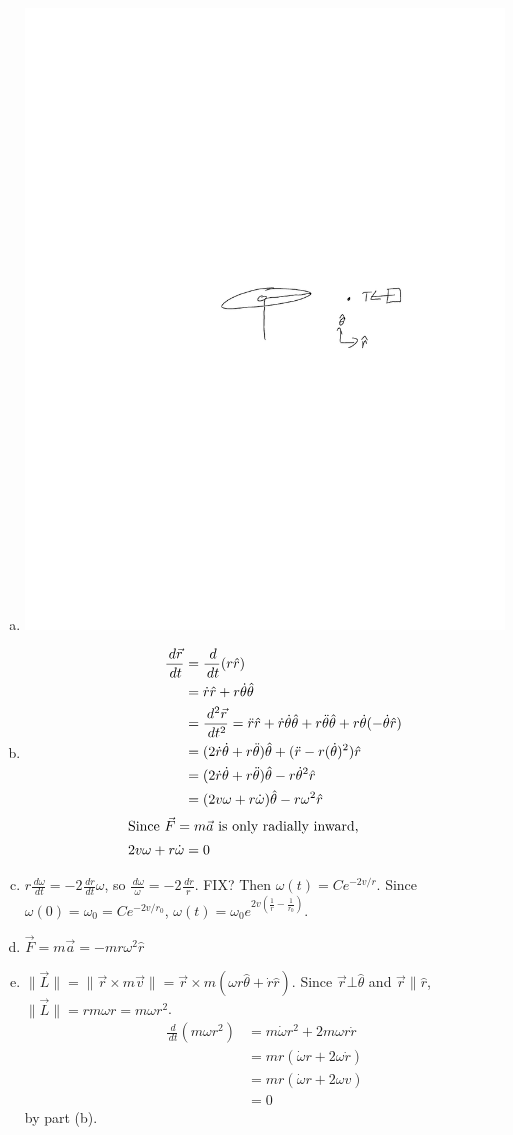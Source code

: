 \documentclass{esg8012pset}
\renewcommand{\d}{\,d}
\providecommand{\norm}[1]{\lVert#1\rVert}
\begin{document}
\begin{solution}
  \begin{enumerate}[a)]
    \item \includegraphics[width=.5\textwidth]{2009-10-02_Diagram_5_0}
    \item \begin{align*}
      \frac{\d \vec r}{\d t} & = \frac{\d}{\d t}(r \hat r) \\
       & = \dot r \hat r + r\dot\theta \hat\theta \\
       & = \frac{\d^2 \vec r}{\d t^2} = \ddot r\hat r + \dot r\dot\theta \hat \theta + r \ddot\theta\hat\theta + r\dot\theta(-\dot\theta\hat r) \\
       & = (2\dot r\dot\theta + r\ddot\theta)\hat\theta +(\ddot r - r(\dot\theta)^2)\hat r \\
       & = (2\dot r\dot\theta + r\ddot\theta)\hat\theta - r\dot\theta^2\hat r \\
       & = (2v\omega + r\dot\omega)\hat\theta - r\omega^2\hat r \\
       \intertext{Since $\vec F = m \vec a$ is only radially inward,}
       2v\omega + r\dot \omega & = 0 
    \end{align*}
    \item $r\frac{\d \omega}{\d t} = -2 \frac{\d r}{\d t}\omega$, so $\frac{\d \omega}{\omega} = -2\frac{\d r}{r}$.  FIX? Then $\omega(t) = C e^{-2v / r}$.   Since $\omega(0) = \omega_0 = Ce^{-2v/r_0}$, $\omega(t) = \omega_0 e^{2v\left(\frac{1}{r} - \frac{1}{r_0}\right)}$.
    \item $\vec F = m\vec a = -mr\omega^2\hat r$
    \item $\norm{\vec L} = \norm{\vec r\times m \vec v} = \vec r\times m(\omega r\hat\theta + \dot r\hat r)$.  Since $\vec r \bot \hat\theta$ and $\vec r \| \hat r$, $\norm{\vec L} = rm\omega r = m\omega r^2$.  \begin{align*}
     \frac{\d }{\d t}(m \omega r^2) & = m\dot\omega r^2 + 2m\omega r\dot r \\
      & = m r(\dot\omega r + 2\omega\dot r) \\
      & = m r(\dot \omega r + 2\omega v) \\
      & = 0
      \end{align*} by part (b).
  \end{enumerate}
\end{solution}
\end{document}
